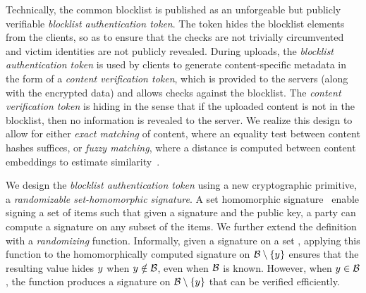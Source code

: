 Technically, the common blocklist is published as an unforgeable but publicly verifiable
\emph{blocklist authentication token}. The token hides the blocklist elements from the clients, so 
as to ensure that the checks are not trivially circumvented and victim identities are not 
publicly revealed. During uploads, the \emph{blocklist authentication token} is
used by clients to generate content-specific metadata
in the form of a \emph{content verification token}, which is provided to the servers (along with the encrypted data)
and allows checks against the blocklist. The
\emph{content verification token} is hiding in the sense that if the uploaded content is
not in the blocklist, then no information is revealed to the server.
We realize this design to allow for either \emph{exact matching} of content, where an equality test between
content hashes suffices, or \emph{fuzzy matching}, where a
distance is computed between content embeddings to estimate
similarity~\cite{yang2025certphash}.






%



%

%
We design the \emph{blocklist authentication token} using a new cryptographic primitive, a \emph{randomizable set-homomorphic
signature}. A set homomorphic signature~\cite{johnson2002homomorphic} enable signing a set of items such that given a
signature and the public key, a party can compute a signature
on any subset of the items. We further extend the definition with a \emph{randomizing} function. Informally, given a signature on a
set \blocklist, applying this function to the homomorphically computed
signature on $\blocklist \setminus \{\genericCInputElmt\}$ ensures
that the resulting value hides $\genericCInputElmt$ when
$\genericCInputElmt \notin \blocklist$, even when $\blocklist$ is
known. However, when $\genericCInputElmt \in \blocklist$, the function
produces a signature on $\blocklist \setminus
\{\genericCInputElmt\}$ that can be verified efficiently. 
%

